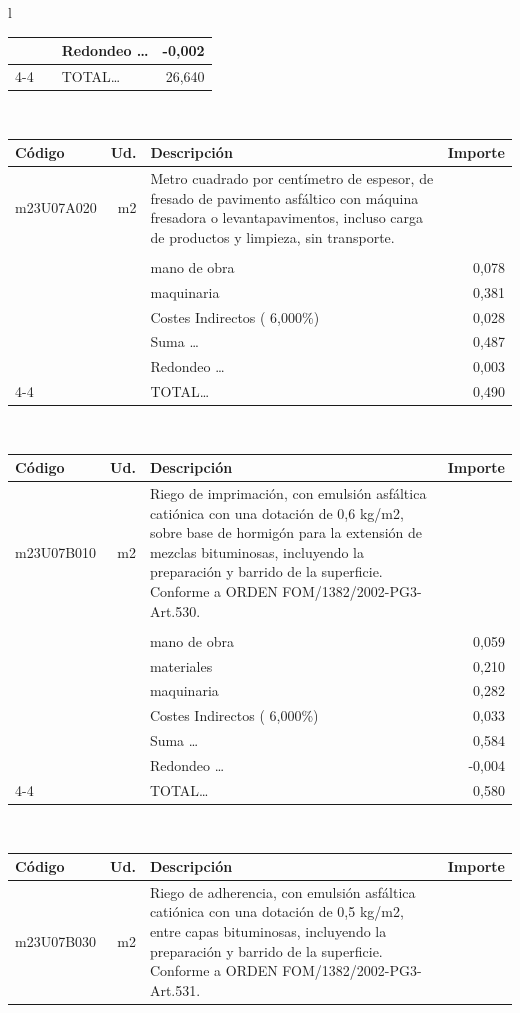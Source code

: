 \documentclass{book}%
\begin{document}
\begin{longtable}{l}
\begin{tabular}{l r p{60mm} r}
&&Redondeo \ldots&    {-}0,002\\%
\cline{4-4}%
&&TOTAL\ldots&    26,640\\%
\end{tabular}\\%
\begin{tabular}{l r p{60mm} r}%
Código&Ud.&Descripción&Importe\\%
\hline%
m23U07A020&m2&Metro cuadrado por centímetro de espesor, de fresado de pavimento asfáltico con máquina fresadora o levantapavimentos, incluso carga de productos y limpieza, sin transporte.&\\%
&&&\\%
&&mano de obra&     0,078\\%
&&maquinaria&     0,381\\%
&&Costes Indirectos (     6,000\%)&     0,028\\%
&&Suma \ldots&     0,487\\%
&&Redondeo \ldots&     0,003\\%
\cline{4-4}%
&&TOTAL\ldots&     0,490\\%
\end{tabular}\\%
\begin{tabular}{l r p{60mm} r}%
Código&Ud.&Descripción&Importe\\%
\hline%
m23U07B010&m2&Riego de imprimación, con emulsión asfáltica catiónica con una dotación de 0,6 kg/m2, sobre base de hormigón para la extensión de mezclas bituminosas, incluyendo la preparación y barrido de la superficie. Conforme a ORDEN FOM/1382/2002{-}PG3{-}Art.530.&\\%
&&&\\%
&&mano de obra&     0,059\\%
&&materiales&     0,210\\%
&&maquinaria&     0,282\\%
&&Costes Indirectos (     6,000\%)&     0,033\\%
&&Suma \ldots&     0,584\\%
&&Redondeo \ldots&    {-}0,004\\%
\cline{4-4}%
&&TOTAL\ldots&     0,580\\%
\end{tabular}\\%
\begin{tabular}{l r p{60mm} r}%
Código&Ud.&Descripción&Importe\\%
\hline%
m23U07B030&m2&Riego de adherencia, con emulsión asfáltica catiónica con una dotación de 0,5 kg/m2, entre capas bituminosas, incluyendo la preparación y barrido de la superficie. Conforme a ORDEN FOM/1382/2002{-}PG3{-}Art.531.&\\%

\end{tabular}
\end{longtable}
\end{document}

